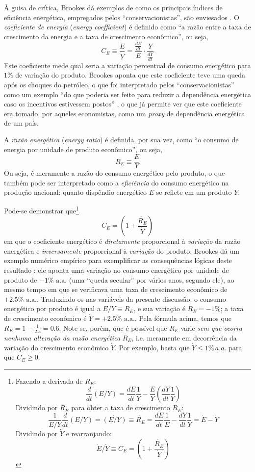 À guisa de crítica, Brookes dá exemplos de como os principais índices de eficiência energética, empregados pelos ``conservacionistas'', são enviesados \parencite[p. 321]{Brookes1990}. O \textit{coeficiente de energia} (\textit{energy coefficient}) é definido como ``a razão entre a taxa de crescimento da energia e a taxa de crescimento econômico'', ou seja,
$$
C_E \equiv \frac{\dot{E}}{\dot{Y}} = \frac{\frac{dE}{dt}}{E} \cdot \frac{Y}{\frac{dY}{dt}}
$$
Este coeficiente mede qual seria a variação percentual de consumo energético para $1\%$ de variação do produto. Brookes aponta que este coeficiente teve uma queda após os choques do petróleo, o que foi interpretado pelos ``conservacionistas'' como um exemplo ``do que poderia ser feito para reduzir a dependência energética caso os incentivos estivessem postos'' \parencite[p. 321]{Brookes1990}, o que já permite ver que este coeficiente era tomado, por aqueles economistas, como um \textit{proxy} de dependência energética de um país. 


A \textit{razão energética} (\textit{energy ratio}) é definida, por sua vez, como ``o consumo de energia por unidade de produto econômico'', ou seja,
$$
R_E \equiv \frac{E}{Y}
$$
Ou seja, é meramente a razão do consumo energético pelo produto, o que também pode ser interpretado como a \textit{eficiência} do consumo energético na produção nacional: quanto dispêndio energético $E$ se reflete em um produto $Y$. 

Pode-se demonstrar que\footnote{Fazendo a derivada de $R_E$: 
$$
\frac{d}{dt}\left(E/Y\right) = \frac{dE}{dt}\frac{1}{Y} - \frac{E}{Y} \left(\frac{dY}{dt}\frac{1}{Y}\right)
$$
Dividindo por $R_E$ para obter a taxa de crescimento $\dot{R_E}$: 
$$
\frac{1}{E/Y} \frac{d}{dt}\left(E/Y\right) = \dot{\left(E/Y\right)} \equiv \dot{R_E} = \frac{dE}{dt}\frac{1}{E} - \frac{dY}{dt}\frac{1}{Y} = \dot{E} - \dot{Y}
$$
Dividindo por $\dot{Y}$ e rearranjando:
$$
\dot{E}/\dot{Y} \equiv C_E = \left(1 + \frac{\dot{R_E}}{\dot{Y}}\right)
$$}
$$
C_E = \left(1 + \frac{\dot{R_E}}{\dot{Y}}\right)
$$
em que o coeficiente energético é \textit{diretamente} proporcional à \textit{variação} da razão energética e \textit{inversamente} proporcional à \textit{variação} do produto. Brookes dá um exemplo numérico empírico para exemplificar as consequências lógicas deste resultado \parencite[p. 321-2]{Brookes1990}: ele aponta uma variação no consumo energético por unidade de produto de $-1\%\text{ a.a.}$ (uma ``queda secular'' por vários anos, segundo ele), ao mesmo tempo em que se verificava uma taxa de crescimento econômico de $+2.5\%\text{ a.a.}$. Traduzindo-os nas variáveis da presente discussão: o consumo energético por produto é igual a $E/Y \equiv R_E$, e sua variação é $\dot{R_E} = -1\%$; a taxa de crescimento econômico é $\dot{Y} = +2.5\%\text{ a.a.}$. Pela fórmula acima, temos que $R_E = 1 - \frac{1}{2.5} = 0.6$. Note-se, porém, que é possível que $R_E$ varie \textit{sem que ocorra nenhuma alteração da razão energética} $\dot{R_E}$, i.e. meramente em decorrência da variação do crescimento econômico $\dot{Y}$. Por exemplo, basta que $\dot{Y} \leq 1\%\, a.a.$ para que $C_E \geq 0$. 


